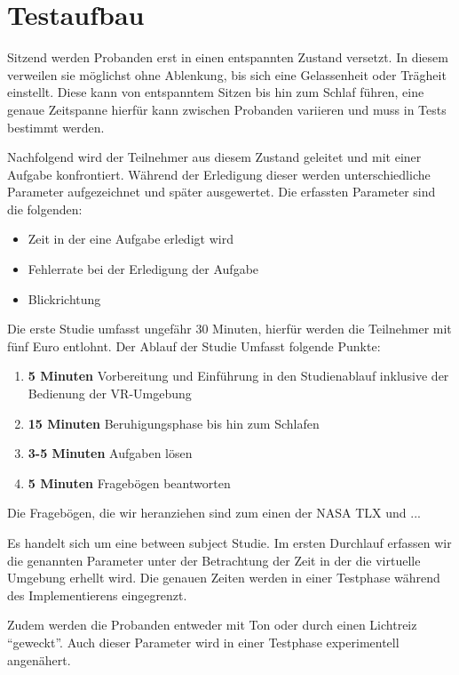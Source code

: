 \section{Testaufbau}
Sitzend werden Probanden erst in einen entspannten Zustand versetzt. In diesem verweilen sie möglichst ohne Ablenkung, bis sich eine Gelassenheit oder Trägheit einstellt. Diese kann von entspanntem Sitzen bis hin zum Schlaf führen, eine genaue Zeitspanne hierfür kann zwischen Probanden variieren und muss in Tests bestimmt werden.

Nachfolgend wird der Teilnehmer aus diesem Zustand geleitet und mit einer Aufgabe konfrontiert. Während der Erledigung dieser werden unterschiedliche Parameter aufgezeichnet und später ausgewertet. Die erfassten Parameter sind die folgenden:

\begin{itemize}
	\item Zeit in der eine Aufgabe erledigt wird
	\item Fehlerrate bei der Erledigung der Aufgabe
	\item Blickrichtung
\end{itemize}

Die erste Studie umfasst ungefähr 30 Minuten, hierfür werden die Teilnehmer mit fünf Euro entlohnt. Der Ablauf der Studie Umfasst folgende Punkte:

\begin{enumerate}
	\item \textbf{5 Minuten} Vorbereitung und Einführung in den Studienablauf inklusive der Bedienung der VR-Umgebung
	\item \textbf{15 Minuten} Beruhigungsphase bis hin zum Schlafen
	\item \textbf{3-5 Minuten} Aufgaben lösen
	\item \textbf{5 Minuten} Fragebögen beantworten
\end{enumerate}

Die Fragebögen, die wir heranziehen sind zum einen der NASA TLX und ... 

Es handelt sich um eine between subject Studie. Im ersten Durchlauf erfassen wir die genannten Parameter unter der Betrachtung der Zeit in der die virtuelle Umgebung erhellt wird. Die genauen Zeiten werden in einer Testphase während des Implementierens eingegrenzt.

Zudem werden die Probanden entweder mit Ton oder durch einen Lichtreiz "`geweckt"'. Auch dieser Parameter wird in einer Testphase experimentell angenähert.

